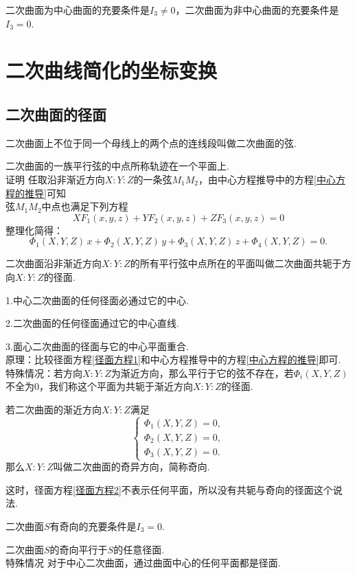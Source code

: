 \inference[中心曲面的充要条件]
二次曲面为中心曲面的充要条件是$I_3 \ne 0$，二次曲面为非中心曲面的充要条件是$I_3 = 0$.



\section{二次曲线简化的坐标变换}
\subsection{二次曲面的径面}
\tdefination[二次曲面的弦]
二次曲面上不位于同一个母线上的两个点的连线段叫做二次曲面的弦.

\theorem[二次曲面平行弦定理]
二次曲面的一族平行弦的中点所称轨迹在一个平面上.\\
{\color{dy}证明} \kg 任取沿非渐近方向$X:Y:Z$的一条弦$M_1M_2$，由中心方程推导中的方程\eqref{中心方程的推导}可知\\弦$M_1M_2$中点也满足下列方程
\begin{equation}
\label{径面方程1}
XF_1(x,y,z)  +YF_2(x,y,z)+ZF_3(x,y,z)=0
\end{equation}
整理化简得：
\begin{equation}
\label{径面方程2}
\varPhi_1(X,Y,Z) \, x+\varPhi_2(X,Y,Z) \, y+\varPhi_3(X,Y,Z) \, z +\varPhi_4(X,Y,Z)=0.
\end{equation}

二次曲面沿非渐近方向$X:Y:Z$的所有平行弦中点所在的平面叫做二次曲面共轭于方向$X:Y:Z$的{\color{dy}径面}.

\inference[二次曲面中心与径面的关系]
1.中心二次曲面的任何径面必通过它的中心.
\par 2.二次曲面的任何径面通过它的中心直线.
\par 3.面心二次曲面的径面与它的中心平面重合.\\
{\color{dy}原理}：比较径面方程\eqref{径面方程1}和中心方程推导中的方程\eqref{中心方程的推导}即可.\\
{\color{dy}特殊情况}：若方向$X:Y:Z$为渐近方向，那么平行于它的弦不存在，若$\varPhi_i(X,Y,Z)$不全为$0$，我们称这个平面为共轭于渐近方向$X:Y:Z$的径面.

若二次曲面的渐近方向$X:Y:Z$满足
\begin{equation}
	\begin{cases}
	\varPhi_1(X,Y,Z)=0,\\
	\varPhi_2(X,Y,Z)=0,\\
	\varPhi_3(X,Y,Z)=0.
	\end{cases}
\end{equation}
那么$X:Y:Z$叫做二次曲面的{\color{dy}奇异方向}，简称{\color{dy}奇向}.
\par 这时，径面方程\eqref{径面方程2}不表示任何平面，所以没有共轭与奇向的径面这个说法.
\par \kg \kg 二次曲面$S$有奇向的充要条件是$I_3 = 0$.
\par \kg \kg 二次曲面$S$的奇向平行于$S$的任意径面.\\
{\color{dy}特殊情况} \quad \colorbox{文字底色}{对于中心二次曲面，通过曲面中心的任何平面都是径面.}

